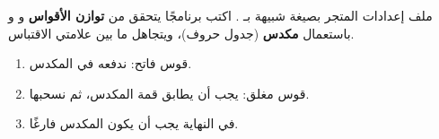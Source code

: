 \begin{statement}
ملف إعدادات المتجر بصيغة شبيهة بـ . اكتب برنامجًا يتحقق من \textbf{توازن الأقواس} \code{()} و\code{[]} و\code{\{\}} باستعمال \textbf{مكدس} (جدول حروف)، ويتجاهل ما بين علامتي الاقتباس.
\end{statement}
\begin{stepsbox}\begin{enumerate}
\item قوس فاتح: ندفعه في المكدس.
\item قوس مغلق: يجب أن يطابق قمة المكدس، ثم نسحبها.
\item في النهاية يجب أن يكون المكدس فارغًا.
\end{enumerate}\end{stepsbox}
